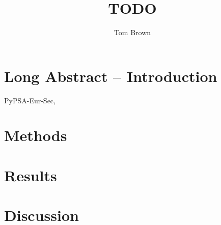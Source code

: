 \documentclass[10pt,5p,reversenotenum,lefttitle]{elsarticle}
\begin{document}
\begin{frontmatter}

	\title{TODO}

    \author[tub]{Tom Brown}
	\address[tub]{Department of Digital Transformation in Energy Systems, Institute of Energy Technology, Technische Universität Berlin, Fakultät III, Einsteinufer 25 (TA 8), 10587 Berlin, Germany}

\end{frontmatter}

\section{Long Abstract -- Introduction}

PyPSA-Eur-Sec,\cite{PyPSAEurSecSectorCoupled}
\lipsum[2-4]

\section*{Methods}

\lipsum[2-4]

\section*{Results}

\lipsum[2-4]

\section*{Discussion}

\lipsum[2-4]


\end{document}
